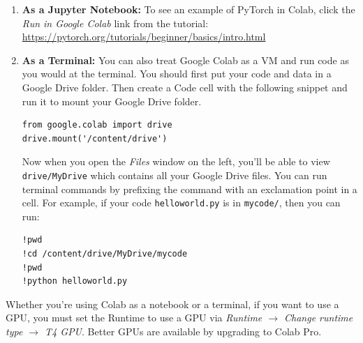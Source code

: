 \documentclass[11pt,addpoints,answers]{exam}
\begin{document}
\begin{enumerate}
\item \textbf{As a Jupyter Notebook:} To see an example of PyTorch in Colab, click the \emph{Run in Google Colab} link from the tutorial: \url{https://pytorch.org/tutorials/beginner/basics/intro.html}

\item \textbf{As a Terminal:} You can also treat Google Colab as a VM and run code as you would at the terminal. You should first put your code and data in a Google Drive folder. Then create a Code cell with the following snippet and run it to mount your Google Drive folder. 
\begin{lstlisting}
from google.colab import drive
drive.mount('/content/drive')
\end{lstlisting}
Now when you open the \emph{Files} window on the left, you'll be able to view \lstinline{drive/MyDrive}
which contains all your Google Drive files. You can run terminal commands by prefixing the command with an exclamation point in a cell. For example, if your code \lstinline{helloworld.py} is in \lstinline{mycode/}, then you can run:
\begin{lstlisting}
!pwd
!cd /content/drive/MyDrive/mycode
!pwd
!python helloworld.py
\end{lstlisting}
    
\end{enumerate}

Whether you're using Colab as a notebook or a terminal, if you want to use a GPU, you must set the Runtime to use a GPU via \emph{Runtime $\rightarrow$ Change runtime type $\rightarrow$ T4 GPU}. Better GPUs are available by upgrading to Colab Pro.
\end{document}
